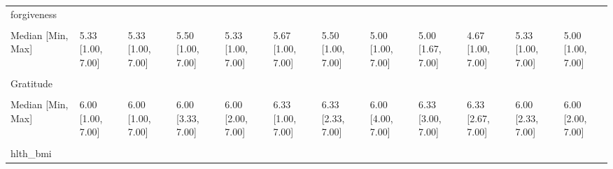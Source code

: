 \documentclass[
  single column]{article}
\begin{document}
\begin{landscape}
\begin{longtable}[t]{llllllllllll}
forgiveness &  &  &  &  &  &  &  &  &  &  & \\
\addlinespace
\cellcolor{gray!10}{Mean (SD)} & \cellcolor{gray!10}{5.02 (1.32)} & \cellcolor{gray!10}{5.25 (1.27)} & \cellcolor{gray!10}{5.16 (1.39)} & \cellcolor{gray!10}{5.10 (1.33)} & \cellcolor{gray!10}{5.32 (1.28)} & \cellcolor{gray!10}{5.26 (1.31)} & \cellcolor{gray!10}{4.93 (1.45)} & \cellcolor{gray!10}{4.89 (1.39)} & \cellcolor{gray!10}{4.44 (1.47)} & \cellcolor{gray!10}{5.15 (1.29)} & \cellcolor{gray!10}{4.85 (1.48)}\\
Median [Min, Max] & 5.33 [1.00, 7.00] & 5.33 [1.00, 7.00] & 5.50 [1.00, 7.00] & 5.33 [1.00, 7.00] & 5.67 [1.00, 7.00] & 5.50 [1.00, 7.00] & 5.00 [1.00, 7.00] & 5.00 [1.67, 7.00] & 4.67 [1.00, 7.00] & 5.33 [1.00, 7.00] & 5.00 [1.00, 7.00]\\
\cellcolor{gray!10}{Missing} & \cellcolor{gray!10}{118 (0.5\%)} & \cellcolor{gray!10}{6 (0.4\%)} & \cellcolor{gray!10}{1 (0.4\%)} & \cellcolor{gray!10}{15 (0.7\%)} & \cellcolor{gray!10}{21 (0.6\%)} & \cellcolor{gray!10}{9 (0.8\%)} & \cellcolor{gray!10}{2 (1.5\%)} & \cellcolor{gray!10}{0 (0\%)} & \cellcolor{gray!10}{0 (0\%)} & \cellcolor{gray!10}{2 (0.3\%)} & \cellcolor{gray!10}{5 (0.7\%)}\\
Gratitude &  &  &  &  &  &  &  &  &  &  & \\
\cellcolor{gray!10}{Mean (SD)} & \cellcolor{gray!10}{5.84 (0.943)} & \cellcolor{gray!10}{5.92 (0.888)} & \cellcolor{gray!10}{6.01 (0.874)} & \cellcolor{gray!10}{5.99 (0.867)} & \cellcolor{gray!10}{6.10 (0.861)} & \cellcolor{gray!10}{6.05 (0.859)} & \cellcolor{gray!10}{5.99 (0.813)} & \cellcolor{gray!10}{5.98 (0.949)} & \cellcolor{gray!10}{6.03 (0.930)} & \cellcolor{gray!10}{5.89 (0.893)} & \cellcolor{gray!10}{5.86 (0.999)}\\
\addlinespace
Median [Min, Max] & 6.00 [1.00, 7.00] & 6.00 [1.00, 7.00] & 6.00 [3.33, 7.00] & 6.00 [2.00, 7.00] & 6.33 [1.00, 7.00] & 6.33 [2.33, 7.00] & 6.00 [4.00, 7.00] & 6.33 [3.00, 7.00] & 6.33 [2.67, 7.00] & 6.00 [2.33, 7.00] & 6.00 [2.00, 7.00]\\
\cellcolor{gray!10}{Missing} & \cellcolor{gray!10}{92 (0.4\%)} & \cellcolor{gray!10}{8 (0.6\%)} & \cellcolor{gray!10}{2 (0.7\%)} & \cellcolor{gray!10}{17 (0.8\%)} & \cellcolor{gray!10}{25 (0.7\%)} & \cellcolor{gray!10}{6 (0.5\%)} & \cellcolor{gray!10}{1 (0.7\%)} & \cellcolor{gray!10}{0 (0\%)} & \cellcolor{gray!10}{2 (0.3\%)} & \cellcolor{gray!10}{3 (0.5\%)} & \cellcolor{gray!10}{7 (0.9\%)}\\
hlth\_bmi &  &  &  &  &  &  &  &  &  &  & \\

\end{longtable}
\end{landscape}
\end{document}
